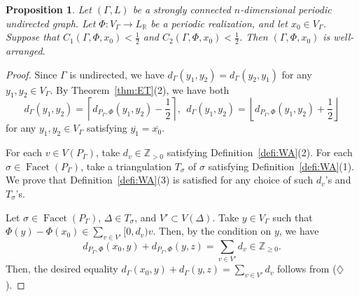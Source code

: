 \documentclass[10pt,a4paper]{amsart}
\theoremstyle{plain}
\newtheorem{prop}[cdrthm]{Proposition}
\theoremstyle{definition}
\theoremstyle{remark}
\begin{document}
\begin{prop}\label{prop:refWA}
Let $(\Gamma , L)$ be a strongly connected $n$-dimensional periodic undirected graph. 
Let $\Phi : V_{\Gamma} \to L_{\mathbb{R}}$ be a periodic realization, and let $x_0 \in V_{\Gamma}$. 
Suppose that $C_1(\Gamma, \Phi, x_0) < \frac{1}{2}$ and $C_2(\Gamma, \Phi, x_0) < \frac{1}{2}$. 
Then $(\Gamma, \Phi, x_0)$ is well-arranged. 
\end{prop}
\begin{proof}
Since $\Gamma$ is undirected, we have $d_{\Gamma}(y_1,y_2) = d_{\Gamma}(y_2,y_1)$ for any $y_1, y_2 \in V_{\Gamma}$. 
By Theorem~\ref{thm:ET}(2), we have both
\[
d_{\Gamma}(y_1, y_2) 
= \left \lceil d_{P_{\Gamma}, \Phi}(y_1, y_2) - \frac{1}{2} \right \rceil, \ \ 
d_{\Gamma}(y_1, y_2) 
= \left \lfloor d_{P_{\Gamma}, \Phi}(y_1, y_2) + \frac{1}{2} \right \rfloor
\tag{$\diamondsuit$}
\]
for any $y_1, y_2 \in V_{\Gamma}$ satisfying $\overline{y_1} = \overline{x_0}$. 

For each $v \in V(P_{\Gamma})$, take $d_v \in \mathbb{Z}_{>0}$ satisfying Definition~\ref{defi:WA}(2). 
For each $\sigma \in \operatorname{Facet}(P_{\Gamma})$, take a triangulation $T_{\sigma}$ of $\sigma$ satisfying Definition~\ref{defi:WA}(1). 
We prove that Definition~\ref{defi:WA}(3) is satisfied for any choice of such $d_v$'s and $T_{\sigma}$'s. 

Let $\sigma \in \operatorname{Facet}(P_{\Gamma})$, $\Delta \in T_{\sigma}$, and $V' \subset V(\Delta)$. Take $y \in V_{\Gamma}$ such that $\Phi(y) - \Phi(x_0) \in \sum _{v \in V'} [0,d_v) v$. 
Then, by the condition on $y$, we have 
\[
d_{P_{\Gamma}, \Phi}(x_0, y) + d_{P_{\Gamma}, \Phi}(y, z) 
= \sum _{v \in V'} d_v \in \mathbb{Z}_{\ge 0}. 
\]
Then, the desired equality $d_{\Gamma}(x_0, y) + d_{\Gamma}(y,z) = \sum _{v \in V'} d_v$ 
follows from ($\diamondsuit$). 
\end{proof}
\end{document}
